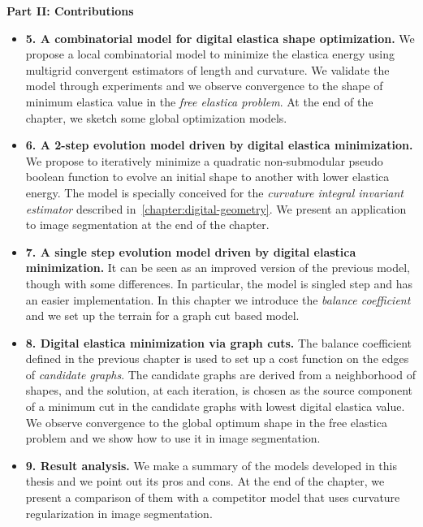 \textbf{Part II: Contributions}
\begin{itemize}
\item[]{\textbf{5. A combinatorial model for digital elastica shape optimization.} We propose a local combinatorial model to minimize the elastica energy using multigrid convergent estimators of length and curvature. We validate the model through experiments and we observe convergence to the shape of minimum elastica value in the \emph{free elastica problem}. At the end of the chapter, we sketch some  global optimization models.}
\item[]{\textbf{6. A 2-step evolution model driven by digital elastica minimization.} We propose to iteratively minimize a quadratic non-submodular pseudo boolean function to evolve an initial shape to another with lower elastica energy. The model is specially conceived for the \emph{curvature integral invariant estimator} described in~\cref{chapter:digital-geometry}. We present an application to image segmentation at the end of the chapter. }
\item[]{\textbf{7. A single step evolution model driven by digital elastica minimization.} It can be seen as an improved version of the previous model, though with some differences. In particular, the model is singled step and has an easier implementation. In this chapter we introduce the \emph{balance coefficient} and we set up the terrain for a graph cut based model.}
\item[]{\textbf{8. Digital elastica minimization via graph cuts.} The balance coefficient defined in the previous chapter is used to set up a cost function on the edges of \emph{candidate graphs}. The candidate graphs are derived from a neighborhood of shapes, and the solution, at each iteration, is chosen as the source component of a minimum cut in the candidate graphs with lowest digital elastica value. We observe convergence to the global optimum shape in the free elastica problem and we show how to use it in image segmentation. }
\item[]{\textbf{9. Result analysis.} We make a summary of the models developed in this thesis and we point out its pros and cons. At the end of the chapter, we present a comparison of them with a competitor model that uses curvature regularization in image segmentation. }
\end{itemize}

